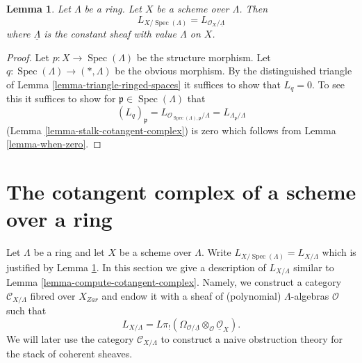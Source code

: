 \documentclass[10pt,a4paper]{article}
\theoremstyle{plain}
\newtheorem{lemma}[subsection]{Lemma}
\theoremstyle{definition}
\theoremstyle{remark}
\numberwithin{equation}{subsection}
\def\Spec{\mathop{\mathrm{Spec}}}
\begin{document}
\begin{lemma}
\label{lemma-scheme-over-ring}
Let $\Lambda$ be a ring. Let $X$ be a scheme over $\Lambda$.
Then
$$
L_{X/\Spec(\Lambda)} = L_{\mathcal{O}_X/\underline{\Lambda}}
$$
where $\underline{\Lambda}$ is the constant sheaf with value
$\Lambda$ on $X$.
\end{lemma}

\begin{proof}
Let $p : X \to \Spec(\Lambda)$ be the structure morphism.
Let $q : \Spec(\Lambda) \to (*, \Lambda)$ be the obvious morphism.
By the distinguished triangle of Lemma \ref{lemma-triangle-ringed-spaces}
it suffices to show that $L_q = 0$. To see this it suffices to
show for $\mathfrak p \in \Spec(\Lambda)$ that
$$
(L_q)_\mathfrak p =
L_{\mathcal{O}_{\Spec(\Lambda), \mathfrak p}/\Lambda} =
L_{\Lambda_\mathfrak p/\Lambda}
$$
(Lemma \ref{lemma-stalk-cotangent-complex})
is zero which follows from Lemma \ref{lemma-when-zero}.
\end{proof}






\section{The cotangent complex of a scheme over a ring}
\label{section-cotangent-schemes-variant}

\noindent
Let $\Lambda$ be a ring and let $X$ be a scheme over $\Lambda$.
Write $L_{X/\Spec(\Lambda)} = L_{X/\Lambda}$ which is justified
by Lemma \ref{lemma-scheme-over-ring}.
In this section we give a description of $L_{X/\Lambda}$ similar to
Lemma \ref{lemma-compute-cotangent-complex}.
Namely, we construct a category $\mathcal{C}_{X/\Lambda}$
fibred over $X_{Zar}$ and endow it with a sheaf of (polynomial)
$\Lambda$-algebras $\mathcal{O}$ such that
$$
L_{X/\Lambda} =
L\pi_!(\Omega_{\mathcal{O}/\underline{\Lambda}} \otimes_\mathcal{O}
\underline{\mathcal{O}}_X).
$$
We will later use the category $\mathcal{C}_{X/\Lambda}$ to construct
a naive obstruction theory for the stack of coherent sheaves.
\end{document}
